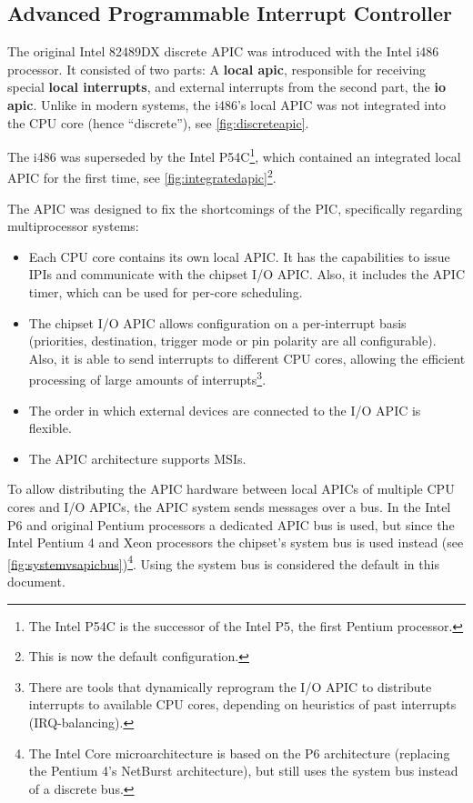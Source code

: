 \subsection{Advanced Programmable Interrupt Controller}
\label{subsec:intelapic}

The original Intel 82489DX discrete APIC was introduced with the Intel i486 processor. It consisted
of two parts: A \textbf{\gls{local apic}}, responsible for receiving special \textbf{\glspl{local
    interrupt}}, and external interrupts from the second part, the \textbf{\gls{io apic}}. Unlike in
modern systems, the i486's local APIC was not integrated into the CPU core (hence ``discrete''),
see \autoref{fig:discreteapic}.

The i486 was superseded by the Intel P54C\footnote{The Intel P54C is the successor of the Intel P5,
  the first Pentium processor.}, which contained an integrated local APIC for the first time, see
\autoref{fig:integratedapic}\footnote{This is now the default configuration.}.

The APIC was designed to fix the shortcomings of the PIC, specifically regarding multiprocessor
systems:

\begin{itemize}
  \item Each CPU core contains its own local APIC. It has the capabilities to issue IPIs and communicate
        with the chipset I/O APIC. Also, it includes the APIC timer, which can be used for per-core
        scheduling.
  \item The chipset I/O APIC allows configuration on a per-interrupt basis (priorities, destination,
        trigger mode or pin polarity are all configurable). Also, it is able to send interrupts to
        different CPU cores, allowing the efficient processing of large amounts of
        interrupts\footnote{There are tools that dynamically reprogram the I/O APIC to distribute
          interrupts to available CPU cores, depending on heuristics of past interrupts (IRQ-balancing).}.
  \item The order in which external devices are connected to the I/O APIC is flexible.
  \item The APIC architecture supports MSIs.
\end{itemize}

To allow distributing the APIC hardware between local APICs of multiple CPU cores and I/O APICs,
the APIC system sends messages over a bus. In the Intel P6 and original Pentium processors a
dedicated APIC bus is used, but since the Intel Pentium 4 and Xeon processors the chipset's system
bus is used instead (see \autoref{fig:systemvsapicbus})\footnote{The Intel Core microarchitecture
  is based on the P6 architecture (replacing the Pentium 4's NetBurst architecture), but still uses
  the system bus instead of a discrete bus.}. Using the system bus is considered the default in this
document.

